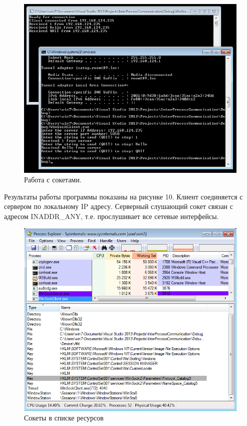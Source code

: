 \documentclass[a4paper, 12pt]{report}		%
\begin{document}
\begin{figure}[h!]
\centering
\includegraphics[scale=0.85]{res/10_Winsock}
\caption{Работа с сокетами.}
\end{figure}

Результаты работы программы показаны на рисунке 10. Клиент соединяется с сервером по локальному IP адресу. Серверный слушающий сокет связан с адресом INADDR\_ANY, т.е. прослушивает все сетевые интерфейсы.

\begin{figure}[h!]
\centering
\includegraphics[scale=1]{res/11_Process_Explorer}
\caption{Сокеты в списке ресурсов}
\end{figure}
\end{document}
